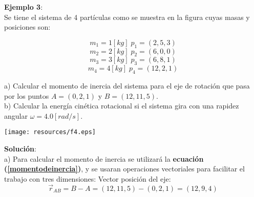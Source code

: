 \documentclass[letter,11pt]{article}
\begin{document}
\vspace{0.75cm}
\begin{minipage}[c]{.4\linewidth}
\textbf{Ejemplo 3}:\\
Se tiene el sistema de 4 partículas como se muestra en la figura cuyas masas y
posiciones son:

\begin{equation*}
    m_1 = 1 [kg]\; p_1 = (2,5,3)
\end{equation*}
\begin{equation*}
    m_2 = 2 [kg]\; p_2 = (6,0,0)
\end{equation*}
\begin{equation*}
    m_3 = 3 [kg]\; p_3 = (6,8,1)
\end{equation*}
\begin{equation*}
    m_4 = 4 [kg]\; p_4 = (12,2,1)
\end{equation*}

a) Calcular el momento de inercia del sistema para el eje de rotación que pasa
por los puntos $A = (0,2,1)$ y $B = (12,11,5)$. \\
b) Calcular la energía cinética rotacional si el sistema gira con una rapidez
angular $\omega = 4.0 [rad/s]$.
\end{minipage}\hfill
\begin{minipage}{.5\linewidth}
\texttt{[image: resources/f4.eps]}
\end{minipage}

\vspace{0.50cm}
\begin{minipage}[b]{.9\linewidth}
\textbf{Solución}:\\
a) Para calcular el momento de inercia se utilizará la \textbf{ecuación
(\ref{momentodeinercia})}, y se usaran operaciones vectoriales para facilitar el
trabajo con tres dimensiones:
Vector posición del eje:
\begin{equation*}
    \vec{r}_{AB} = B - A = (12,11,5) - (0,2,1) = (12,9,4)
\end{equation*}
\end{minipage}
\end{document}
